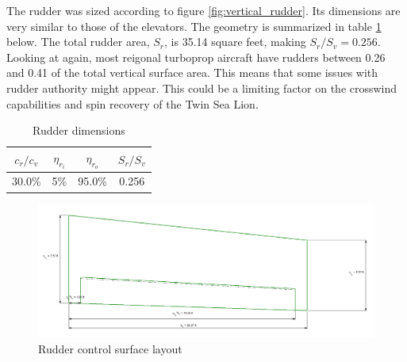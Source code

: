 \documentclass[conf]{new-aiaa}
\begin{document}
The rudder was sized according to figure \ref{fig:vertical_rudder}. Its dimensions are very similar to those of the elevators. The geometry is summarized in table \ref{tab:rudder_size_table} below. The total rudder area, $S_r$, is 35.14 square feet, making $S_r/S_v = 0.256$. Looking at \cite{orange_book} again, most reigonal turboprop aircraft have rudders between 0.26 and 0.41 of the total vertical surface area. This means that some issues with rudder authority might appear. This could be a limiting factor on the crosswind capabilities and spin recovery of the Twin Sea Lion.

\begin{table}[H]
\centering
\caption{Rudder dimensions}
\begin{tabular}{|c|c|c|c|}\hline
    $c_r/c_v$ & $\eta_{r_i}$ & $\eta_{r_o}$ & $S_r/S_v$ \\ \hline
    30.0\%    & 5\%          & 95.0\%       & 0.256     \\ \hline
\end{tabular}
\label{tab:rudder_size_table}
\end{table}

\begin{figure}[H]
    \includegraphics[width=\textwidth]{Report3Printouts/Empannage/Vertical_rudder_plot.png}
    \caption{Rudder control surface layout}
    \label{fig:vertical_rudder_plot}
\end{figure}


\end{document}
